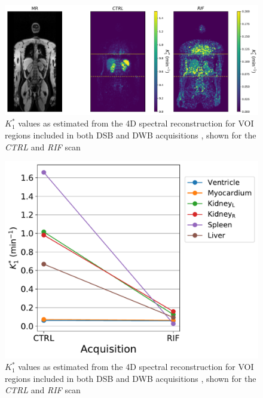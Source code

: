 \begin{figure} [h!]
\centering
\includegraphics[scale=0.5,angle=0]{3_Results/3_3_DWB_Reconstruction/figures/3_3_IsotoPK_K1_SingleSlice.pdf}
\caption{$K_1^{*}$ values as estimated from the 4D spectral reconstruction for VOI regions included in both DSB and DWB acquisitions , shown for the \textit{CTRL} and \textit{RIF} scan}
\label{fig_3_3:IsotoPK_K1_SingleSlice}
\end{figure} 

\begin{figure} [h!]
\centering
\includegraphics[scale=0.5,angle=0]{3_Results/3_3_DWB_Reconstruction/figures/3_3_IsotoPK_K1_drop.pdf}
\caption{$K_1^{*}$ values as estimated from the 4D spectral reconstruction for VOI regions included in both DSB and DWB acquisitions , shown for the \textit{CTRL} and \textit{RIF} scan}
\label{fig_3_3:IsotoPK_K1_drop}
\end{figure} 

